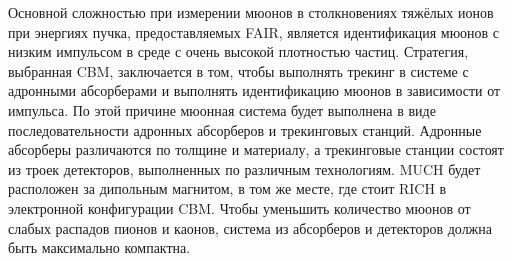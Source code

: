 
Основной сложностью при измерении мюонов в столкновениях тяжёлых ионов при энергиях пучка, предоставляемых FAIR, является идентификация мюонов с низким импульсом в среде с очень высокой плотностью частиц. Стратегия, выбранная CBM, заключается в том, чтобы выполнять трекинг в системе с адронными абсорберами и выполнять идентификацию мюонов в зависимости от импульса. По этой причине мюонная система будет выполнена в виде последовательности адронных абсорберов и трекинговых станций. Адронные абсорберы различаются по толщине и материалу, а трекинговые станции состоят из троек детекторов, выполненных по различным технологиям. MUCH будет расположен за дипольным магнитом, в том же месте, где стоит RICH в электронной конфигурации CBM. Чтобы уменьшить количество мюонов от слабых распадов пионов и каонов, система из абсорберов и детекторов должна быть максимально компактна.


